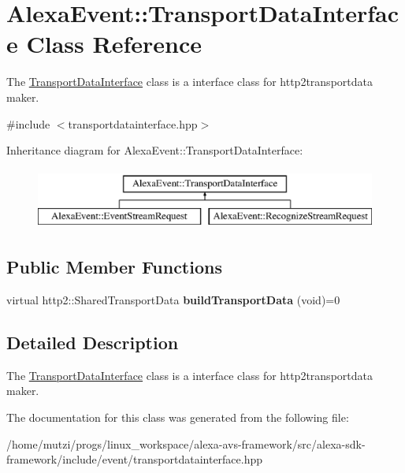\hypertarget{classAlexaEvent_1_1TransportDataInterface}{}\section{Alexa\+Event\+:\+:Transport\+Data\+Interface Class Reference}
\label{classAlexaEvent_1_1TransportDataInterface}


The \hyperlink{classAlexaEvent_1_1TransportDataInterface}{Transport\+Data\+Interface} class is a interface class for http2transportdata maker.  




{\ttfamily \#include $<$transportdatainterface.\+hpp$>$}

Inheritance diagram for Alexa\+Event\+:\+:Transport\+Data\+Interface\+:\begin{figure}[H]
\begin{center}
\leavevmode
\includegraphics[height=2.000000cm]{d6/d51/classAlexaEvent_1_1TransportDataInterface}
\end{center}
\end{figure}
\subsection*{Public Member Functions}
\begin{DoxyCompactItemize}
\item 
\mbox{\label{classAlexaEvent_1_1TransportDataInterface_a7fe06976d41d6dd29f43a3a8c687865a}} 
virtual http2\+::\+Shared\+Transport\+Data {\bfseries build\+Transport\+Data} (void)=0
\end{DoxyCompactItemize}


\subsection{Detailed Description}
The \hyperlink{classAlexaEvent_1_1TransportDataInterface}{Transport\+Data\+Interface} class is a interface class for http2transportdata maker. 

The documentation for this class was generated from the following file\+:\begin{DoxyCompactItemize}
\item 
/home/mutzi/progs/linux\+\_\+workspace/alexa-\/avs-\/framework/src/alexa-\/sdk-\/framework/include/event/transportdatainterface.\+hpp\end{DoxyCompactItemize}
